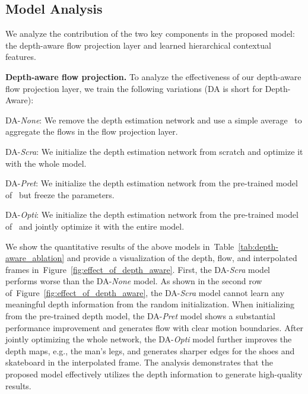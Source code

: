 \documentclass[10pt,twocolumn,letterpaper]{article}
\newcommand{\Paragraph}[1]{{\vspace{-2mm}\flushleft\textbf{#1}}} \newcommand{\ul}[1]{\underline{\smash{#1}}}
\newcommand{\figref}[1]{Figure~\ref{fig:#1}}
\newcommand{\tabref}[1]{Table~\ref{tab:#1}}
\begin{document}
 	
	
	
	\subsection{Model Analysis}
	\label{sec:Ablation}
We analyze the contribution of the two key components in the proposed model: the depth-aware flow projection layer and learned hierarchical contextual features.
	
	
\Paragraph{Depth-aware flow projection.}
To analyze the effectiveness of our depth-aware flow projection layer, we train the following variations (DA is short for Depth-Aware):
	\begin{compactitem}
\item DA-\textit{{None}}: We remove the depth estimation network and use a simple average~\cite{bao2018MEMC-Net} to aggregate the flows in the flow projection layer.
\item DA-\textit{{Scra}}: We initialize the depth estimation network from scratch and optimize it with the whole model.
\item DA-\textit{{Pret}}: We initialize the depth estimation network from the pre-trained model of~\cite{li2018megadepth} but freeze the parameters.
\item DA-\textit{{Opti}}: We initialize the depth estimation network from the pre-trained model of~\cite{li2018megadepth} and jointly optimize it with the entire model.
\end{compactitem}
	
	
	
	We show the quantitative results of the above models in~\tabref{depth-aware_ablation} and provide a visualization of the depth, flow, and interpolated frames in~\figref{effect_of_depth_aware}.
First, the DA-\textit{Scra} model performs worse than the DA-\textit{None} model.
As shown in the second row of~\figref{effect_of_depth_aware}, the DA-\textit{Scra} model cannot learn any meaningful depth information from the random initialization.
When initializing from the pre-trained depth model, the DA-\textit{Pret} model shows a substantial performance improvement and generates flow with clear motion boundaries.
After jointly optimizing the whole network, the DA-\textit{Opti} model further improves the depth maps, e.g., the man's legs, and generates sharper edges for the shoes and skateboard in the interpolated frame.
The analysis demonstrates that the proposed model effectively utilizes the depth information to generate high-quality results.
	
\end{document}
